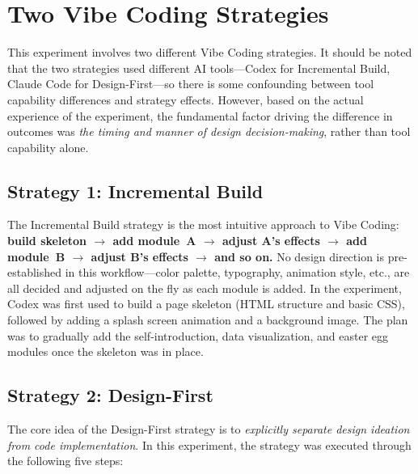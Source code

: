 \section{Two Vibe Coding Strategies}

This experiment involves two different Vibe Coding strategies. It should be noted that the two strategies used different AI tools---Codex for Incremental Build, Claude Code for Design-First---so there is some confounding between tool capability differences and strategy effects. However, based on the actual experience of the experiment, the fundamental factor driving the difference in outcomes was \textit{the timing and manner of design decision-making}, rather than tool capability alone.

\subsection{Strategy 1: Incremental Build}

The Incremental Build strategy is the most intuitive approach to Vibe Coding: \textbf{build skeleton $\rightarrow$ add module~A $\rightarrow$ adjust A's effects $\rightarrow$ add module~B $\rightarrow$ adjust B's effects $\rightarrow$ and so on.}
No design direction is pre-established in this workflow---color palette, typography, animation style, etc., are all decided and adjusted on the fly as each module is added.
In the experiment, Codex was first used to build a page skeleton (HTML structure and basic CSS), followed by adding a splash screen animation and a background image.
The plan was to gradually add the self-introduction, data visualization, and easter egg modules once the skeleton was in place.

\subsection{Strategy 2: Design-First}

The core idea of the Design-First strategy is to \textit{explicitly separate design ideation from code implementation}. In this experiment, the strategy was executed through the following five steps:

